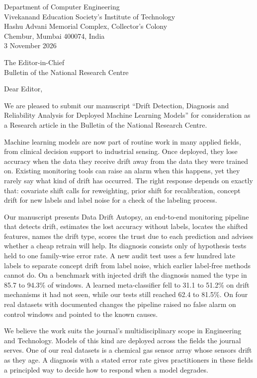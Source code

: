 \documentclass[11pt,a4paper]{article}
\begin{document}
\begin{flushright}
Department of Computer Engineering\\
Vivekanand Education Society's Institute of Technology\\
Hashu Advani Memorial Complex, Collector's Colony\\
Chembur, Mumbai 400074, India\\[6pt]
3 November 2026
\end{flushright}

The Editor-in-Chief\\
Bulletin of the National Research Centre

Dear Editor,

We are pleased to submit our manuscript ``Drift Detection, Diagnosis and Reliability Analysis for Deployed Machine Learning Models'' for consideration as a Research article in the Bulletin of the National Research Centre.

Machine learning models are now part of routine work in many applied fields, from clinical decision support to industrial sensing. Once deployed, they lose accuracy when the data they receive drift away from the data they were trained on. Existing monitoring tools can raise an alarm when this happens, yet they rarely say what kind of drift has occurred. The right response depends on exactly that: covariate shift calls for reweighting, prior shift for recalibration, concept drift for new labels and label noise for a check of the labeling process.

Our manuscript presents Data Drift Autopsy, an end-to-end monitoring pipeline that detects drift, estimates the lost accuracy without labels, locates the shifted features, names the drift type, scores the trust due to each prediction and advises whether a cheap retrain will help. Its diagnosis consists only of hypothesis tests held to one family-wise error rate. A new audit test uses a few hundred late labels to separate concept drift from label noise, which earlier label-free methods cannot do. On a benchmark with injected drift the diagnosis named the type in 85.7 to 94.3\% of windows. A learned meta-classifier fell to 31.1 to 51.2\% on drift mechanisms it had not seen, while our tests still reached 62.4 to 81.5\%. On four real datasets with documented changes the pipeline raised no false alarm on control windows and pointed to the known causes.

We believe the work suits the journal's multidisciplinary scope in Engineering and Technology. Models of this kind are deployed across the fields the journal serves. One of our real datasets is a chemical gas sensor array whose sensors drift as they age. A diagnosis with a stated error rate gives practitioners in these fields a principled way to decide how to respond when a model degrades.
\end{document}
